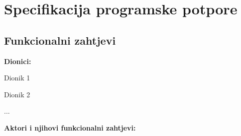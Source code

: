 \chapter{Specifikacija programske potpore}
		
	\section{Funkcionalni zahtjevi}
			
			
%				
			
			
			\noindent \textbf{Dionici:}
			
			\begin{packed_enum}
				
				\item Dionik 1
				\item Dionik 2				
				\item ...
				
			\end{packed_enum}
			
			\noindent \textbf{Aktori i njihovi funkcionalni zahtjevi:}
			

